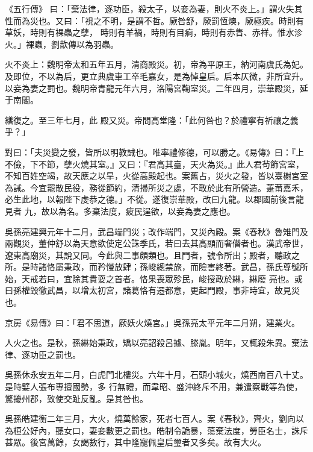 
\begin{pinyinscope}

 《五行傳》
 曰：「棄法律，逐功臣，殺太子，以妾為妻，則火不炎上。」謂火失其性而為災也。又曰：「視之不明，是謂不哲。厥咎舒，厥罰恆燠，厥極疾。時則有草妖，時則有裸蟲之孽，
 時則有羊禍，時則有目痾，時則有赤眚、赤祥。惟水沴火。」裸蟲，劉歆傳以為羽蟲。



 火不炎上：魏明帝太和五年五月，清商殿災。初，帝為平原王，納河南虞氏為妃。及即位，不以為后，更立典虞車工卒毛嘉女，是為悼皇后。后本仄微，非所宜升。以妾為妻之罰也。魏明帝青龍元年六月，洛陽宮鞠室災。二年四月，崇華殿災，延于南閣。



 繕復之。至三年七月，此
 殿又災。帝問高堂隆：「此何咎也？於禮寧有祈禳之義乎？」



 對曰：「夫災變之發，皆所以明教誡也。唯率禮修德，可以勝之。《易傳》曰：『上不儉，下不節，孽火燒其室。』又曰：『君高其臺，天火為災。』此人君茍飾宮室，不知百姓空竭，故天應之以旱，火從高殿起也。案舊占，災火之發，皆以臺榭宮室為誡。今宜罷散民役，務從節約，清掃所災之處，不敢於此有所營造。萐莆嘉禾，必生此地，以報陛下虔恭之德。」不從。遂復崇華殿，改曰九龍。以郡國前後言龍見者
 九，故以為名。多棄法度，疲民逞欲，以妾為妻之應也。



 吳孫亮建興元年十二月，武昌端門災；改作端門，又災內殿。案《春秋》魯雉門及兩觀災，董仲舒以為天意欲使定公誅季氏，若曰去其高顯而奢僭者也。漢武帝世，遼東高廟災，其說又同。今此與二事頗類也。且門者，號令所出；殿者，聽政之所。是時諸恪屬秉政，而矜慢放肆；孫峻總禁旅，而險害終著。武昌，孫氏尊號所始，天戒若曰，宜除其貴耍之首者。恪果喪眾殄民，峻授政於綝，綝廢
 亮也。或曰孫權毀徹武昌，以增太初宮，諸葛恪有遷都意，更起門殿，事非時宜，故見災也。



 京房《易傳》曰：「君不思道，厥妖火燒宮。」吳孫亮太平元年二月朔，建業火。



 人火之也。是秋，孫綝始秉政，矯以亮詔殺呂據、滕胤。明年，又輒殺朱異。棄法律、逐功臣之罰也。



 吳孫休永安五年二月，白虎門北樓災。六年十月，石頭小城火，燒西南百八十丈。是時嬖人張布專擅國勢，多
 行無禮，而韋昭、盛沖終斥不用，兼遣察戰等為使，驚擾州郡，致使交趾反亂。是其咎也。



 吳孫皓建衡二年三月，大火，燒萬餘家，死者七百人。案《春秋》，齊火，劉向以為桓公好內，聽女口，妻妾數更之罰也。皓制令詭暴，蕩棄法度，勞臣名士，誅斥甚眾。後宮萬餘，女謁數行，其中隆寵佩皇后璽者又多矣。故有大火。




\end{pinyinscope}
